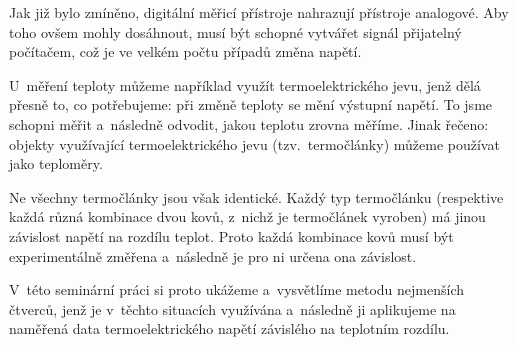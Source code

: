 Jak již bylo zmíněno, digitální měřicí přístroje nahrazují přístroje analogové.
Aby toho ovšem mohly dosáhnout, musí být schopné vytvářet signál přijatelný
počítačem, což je ve velkém počtu případů změna napětí. 

U~měření teploty můžeme například využít termoelektrického jevu, jenž dělá
přesně to, co potřebujeme: při změně teploty se mění výstupní napětí. To jsme
schopni měřit a~následně odvodit, jakou teplotu zrovna měříme. Jinak řečeno:
objekty využívající termoelektrického jevu (tzv.~termočlánky) můžeme používat
jako teploměry.

Ne všechny termočlánky jsou však identické. Každý typ termočlánku (respektive
každá různá kombinace dvou kovů, z~nichž je termočlánek vyroben) má jinou
závislost napětí na rozdílu teplot. Proto každá kombinace kovů musí být
experimentálně změřena a~následně je pro ni určena ona závislost.

V~této seminární práci si proto ukážeme a~vysvětlíme metodu nejmenších čtverců,
jenž je v~těchto situacích využívána a~následně ji aplikujeme na naměřená data
termoelektrického napětí závislého na teplotním rozdílu.
